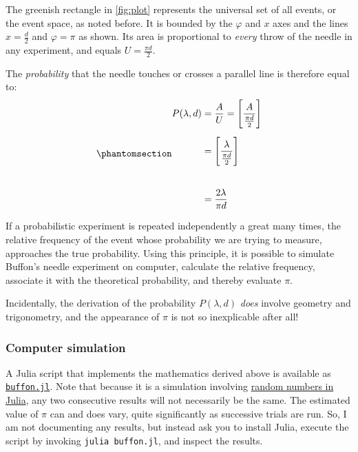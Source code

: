 \documentclass[
  a4paper,
]{article}
\begin{document}
The greenish rectangle in \cref{fig:plot} represents the universal set
of all events, or the event space, as noted before. It is bounded by the
\(\varphi\) and \(x\) axes and the lines \(x =\frac{d}{2}\) and
\(\varphi = \pi\) as shown. Its area is proportional to \emph{every}
throw of the needle in any experiment, and equals
\(U = \frac{\pi d}{2}\).

The \emph{probability} that the needle touches or crosses a parallel
line is therefore equal to:
\begin{equation}\phantomsection\label{eq:fraction-successes}{
\begin{aligned}
P(\lambda, d) &= \displaystyle\frac{A}{U} = \displaystyle \left[ \frac{A}{\frac{\pi d}{2}} \right] \\[0.5em]
&= \displaystyle \left[ \frac{\lambda}{\frac{\pi d}{2}}\right ]\\[2em]
&= \displaystyle \frac{2\lambda}{\pi d}
\end{aligned}
}\end{equation}

If a probabilistic experiment is repeated independently a great many
times, the relative frequency of the event whose probability we are
trying to measure, approaches the true probability. Using this
principle, it is possible to simulate Buffon's needle experiment on
computer, calculate the relative frequency, associate it with the
theoretical probability, and thereby evaluate \(\pi\).

Incidentally, the derivation of the probability \(P(\lambda, d)\)
\emph{does} involve geometry and trigonometry, and the appearance of
\(\pi\) is not so inexplicable after all!  \normalfont

\subsubsection{Computer simulation}\label{computer-simulation}

A Julia script that implements the mathematics derived above is
available as \href{\%7Battacheauxiliary/boffon.jl}{\texttt{buffon.jl}}.
Note that because it is a simulation involving
\href{https://docs.julialang.org/en/v1/stdlib/Random/}{random numbers in
Julia}, any two consecutive results will not necessarily be the same.
The estimated value of \(\pi\) can and does vary, quite significantly as
successive trials are run. So, I am not documenting any results, but
instead ask you to install Julia, execute the script by invoking
\texttt{julia\ buffon.jl}, and inspect the results.
\end{document}
